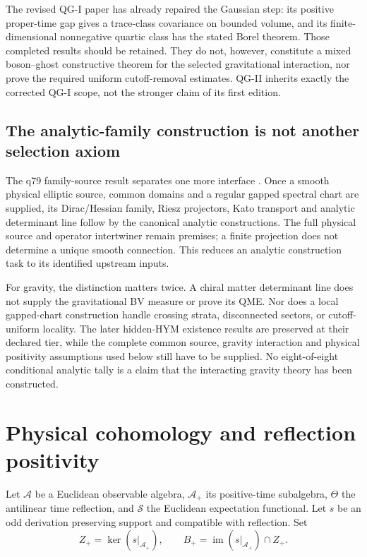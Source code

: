 \documentclass[11pt]{article}
\newcommand{\Aplus}{\mathcal A_{+}}
\begin{document}
The revised QG-I paper has already repaired the Gaussian step: its positive
proper-time gap gives a trace-class covariance on bounded volume, and its
finite-dimensional nonnegative quartic class has the stated Borel theorem.
Those completed results should be retained. They do not, however, constitute
a mixed boson--ghost constructive theorem for the selected gravitational
interaction, nor prove the required uniform cutoff-removal estimates.
QG-II inherits exactly the corrected QG-I scope, not the stronger claim of
its first edition.

\subsection{The analytic-family construction is not another selection axiom}
\label{sec:physical-family-import}

The q79 family-source result separates one more interface
\cite{QMFamilyOwner}. Once a smooth physical elliptic source, common domains
and a regular gapped spectral chart are supplied, its Dirac/Hessian family,
Riesz projectors, Kato transport and analytic determinant line follow by the
canonical analytic constructions. The full physical source and operator
intertwiner remain premises; a finite projection does not determine a unique
smooth connection. This reduces an analytic construction task to its
identified upstream inputs.

For gravity, the distinction matters twice. A chiral matter determinant
line does not supply the gravitational BV measure or prove its QME. Nor
does a local gapped-chart construction handle crossing strata, disconnected
sectors, or cutoff-uniform locality. The later hidden-HYM existence results
are preserved at their declared tier, while the complete common source,
gravity interaction and physical positivity assumptions used below still
have to be supplied. No eight-of-eight conditional analytic tally is a
claim that the interacting gravity theory has been constructed.

\section{Physical cohomology and reflection positivity}

Let $\mathcal A$ be a Euclidean observable algebra, $\Aplus$ its positive-time
subalgebra, $\Theta$ the antilinear time reflection, and $\mathcal S$ the
Euclidean expectation functional.  Let $s$ be an odd derivation preserving
support and compatible with reflection.  Set
\[
 Z_+=\ker(s|_{\Aplus}),\qquad B_+=\operatorname{im}(s|_{\Aplus})\cap Z_+.
\]
\end{document}
